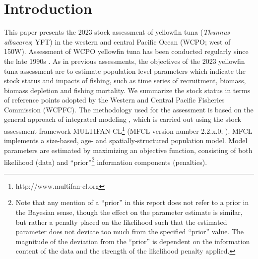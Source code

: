 
\clearpage

\section{Introduction}
\label{sec:introduction}

This paper presents the 2023 stock assessment of yellowfin tuna (\emph{Thunnus albacares}; YFT) in the western and central Pacific Ocean (WCPO; west of 150\degree W). Assessment of WCPO yellowfin tuna has been conducted regularly since the late 1990s \citep{hampton_stock_2003,hampton_stock_2005-1,langley_stock_2011,davies_stock_2014,tremblay-boyer_stock_2017,vincent_stock_2020}. As in previous assessments, the objectives of the 2023 yellowfin tuna assessment are to estimate population level parameters which indicate the stock status and impacts of fishing, such as time series of recruitment, biomass, biomass depletion and fishing mortality. We summarize the stock status in terms of reference points adopted by the Western and Central Pacific Fisheries Commission (WCPFC). The methodology used for the assessment is based on the general approach of integrated modeling \citep{fournier_general-theory_1982}, which is carried out using the stock assessment framework MULTIFAN-CL\footnote{http://www.multifan-cl.org} (MFCL version number 2.2.x.0; \citealp{fournier_multifan-cl_1998,hampton_spatially-disaggregated_2001,kleiber_multifan-cl_2019}). MFCL implements a size-based, age- and spatially-structured population model. Model parameters are estimated by maximizing an objective function, consisting of both likelihood (data) and \enquote{prior}\footnote{Note that any mention of a \enquote{prior} in this report does not refer to a prior in the Bayesian sense, though the effect on the parameter estimate is similar, but rather a penalty placed on the likelihood such that the estimated parameter does not deviate too much from the specified \enquote{prior} value. The magnitude of the deviation from the \enquote{prior} is dependent on the information content of the data and the strength of the likelihood penalty applied.} information components (penalties).

